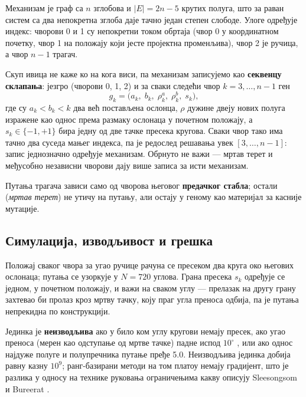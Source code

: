 \documentclass[
  conference,
  a4paper,
  10pt]{IEEEtran}
\begin{document}
Механизам је граф са \(n\) зглобова и \(|E| = 2n-5\) крутих полуга, што
за раван систем са два непокретна зглоба даје тачно један степен
слободе. Улоге одређује индекс: чворови 0 и 1 су непокретни током
обртаја (чвор 0 у координатном почетку, чвор 1 на положају који јесте
пројектна променљива), чвор 2 је ручица, а чвор \(n-1\) трагач.

Скуп ивица не каже ко на кога виси, па механизам записујемо као
\textbf{секвенцу склапања}: језгро (чворови 0, 1, 2) и за сваки следећи
чвор \(k = 3,\dots,n-1\) ген \[
g_k = \big(a_k,\; b_k,\; \rho^a_k,\; \rho^b_k,\; s_k\big),
\] где су \(a_k < b_k < k\) два већ постављена ослонца, \(\rho\) дужине
двеју нових полуга изражене као однос према размаку ослонаца у почетном
положају, а \(s_k \in \{-1,+1\}\) бира једну од две тачке пресека
кругова. Сваки чвор тако има тачно два суседа мањег индекса, па је
редослед решавања увек \([3,\dots,n-1]\): запис једнозначно одређује
механизам. Обрнуто не важи --- мртав терет и међусобно независни чворови
дају више записа за исти механизам.

Путања трагача зависи само од чворова његовог \textbf{предачког стабла};
остали (\emph{мртав терет}) не утичу на путању, али остају у геному као
материјал за касније мутације.

\hypertarget{ux441ux438ux43cux443ux43bux430ux446ux438ux458ux430-ux438ux437ux432ux43eux434ux459ux438ux432ux43eux441ux442-ux438-ux433ux440ux435ux448ux43aux430}{%
\subsection{Симулација, изводљивост и
грешка}\label{ux441ux438ux43cux443ux43bux430ux446ux438ux458ux430-ux438ux437ux432ux43eux434ux459ux438ux432ux43eux441ux442-ux438-ux433ux440ux435ux448ux43aux430}}

Положај сваког чвора за угао ручице рачуна се пресеком два круга око
његових ослонаца; путања се узоркује у \(N = 720\) углова. Грана пресека
\(s_k\) одређује се једном, у почетном положају, и важи на сваком углу
--- прелазак на другу грану захтевао би пролаз кроз мртву тачку, коју
праг угла преноса одбија, па је путања непрекидна по конструкцији.

Јединка је \textbf{неизводљива} ако у било ком углу кругови немају
пресек, ако угао преноса (мерен као одступање од мртве тачке) падне
испод \(10^\circ\) \citep{balli}, или ако однос најдуже полуге и
полупречника путање пређе 5.0. Неизводљива јединка добија равну казну
\(10^9\); ранг-базирани методи на том платоу немају градијент, што је
разлика у односу на технике руковања ограничењима какву описују
Sleesongsom и Bureerat \citep{sleesongsom}.
\end{document}
